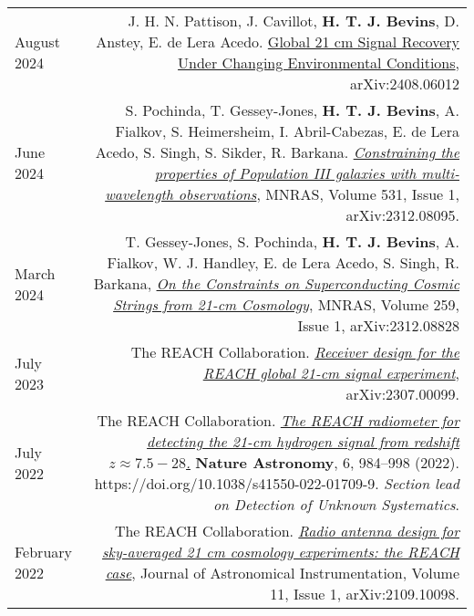 \documentclass{article}
\begin{document}
\begin{tabular}{L!{\vrule}R}
    August 2024 & J. H. N. Pattison, J. Cavillot, \textbf{H. T. J. Bevins}, D. Anstey, E. de Lera Acedo. \href{https://arxiv.org/abs/2408.06012}{Global 21 cm Signal Recovery Under Changing Environmental Conditions}, arXiv:2408.06012 \\
    June 2024 & S. Pochinda, T. Gessey-Jones, \textbf{H. T. J. Bevins}, A. Fialkov, S. Heimersheim, I. Abril-Cabezas, E. de Lera Acedo, S. Singh, S. Sikder, R. Barkana. \href{https://academic.oup.com/mnras/article/531/1/1113/7663583}{\textit{Constraining the properties of Population III galaxies with multi-wavelength observations}}, MNRAS, Volume 531, Issue 1, arXiv:2312.08095. \\
    March 2024 & T. Gessey-Jones, S. Pochinda, \textbf{H. T. J. Bevins}, A. Fialkov, W. J. Handley, E. de Lera Acedo, S. Singh, R. Barkana, \href{https://academic.oup.com/mnras/article/529/1/519/7609695}{\textit{On the Constraints on Superconducting Cosmic Strings from 21-cm Cosmology}}, MNRAS, Volume 259, Issue 1, arXiv:2312.08828 \\
    July 2023 & The REACH Collaboration. \href{https://arxiv.org/abs/2307.00099}{\textit{Receiver design for the REACH global 21-cm signal experiment}}, arXiv:2307.00099. \\
	July 2022 & The REACH Collaboration. \href{https://www.nature.com/articles/s41550-022-01709-9?utm_campaign=related_content&utm_source=ASTRO&utm_medium=communities}{\textit{The REACH radiometer for detecting the 21-cm hydrogen signal from redshift $z \approx 7.5 -28$.}} \textbf{Nature Astronomy}, 6, 984–998 (2022). https://doi.org/10.1038/s41550-022-01709-9. \textit{Section lead on Detection of Unknown Systematics}. \\
	February 2022 & The REACH Collaboration. \href{https://ui.adsabs.harvard.edu/abs/2021arXiv210910098C/abstract}{\textit{Radio antenna design for sky-averaged 21 cm cosmology experiments: the REACH case}}, Journal of Astronomical Instrumentation, Volume 11, Issue 1, arXiv:2109.10098. \\
\end{tabular}

\end{document}
